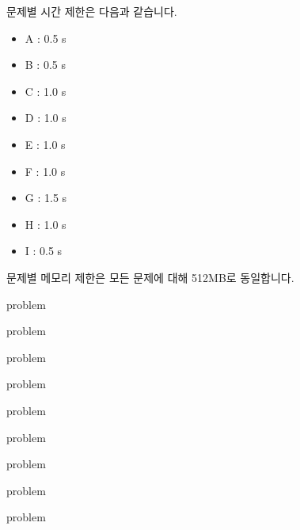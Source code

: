 \documentclass[11pt,a4paper,oneside,final]{article}
\begin{document}
\newpage
문제별 시간 제한은 다음과 같습니다.

\begin{itemize}
\item A : 0.5 s
\item B : 0.5 s
\item C : 1.0 s
\item D : 1.0 s
\item E : 1.0 s
\item F : 1.0 s
\item G : 1.5 s
\item H : 1.0 s
\item I : 0.5 s
\end{itemize}

문제별 메모리 제한은 모든 문제에 대해 512MB로 동일합니다.

\newpage

{problem}

{problem}

{problem}

{problem}

{problem}

{problem}

{problem}

{problem}

{problem}
\end{document}

